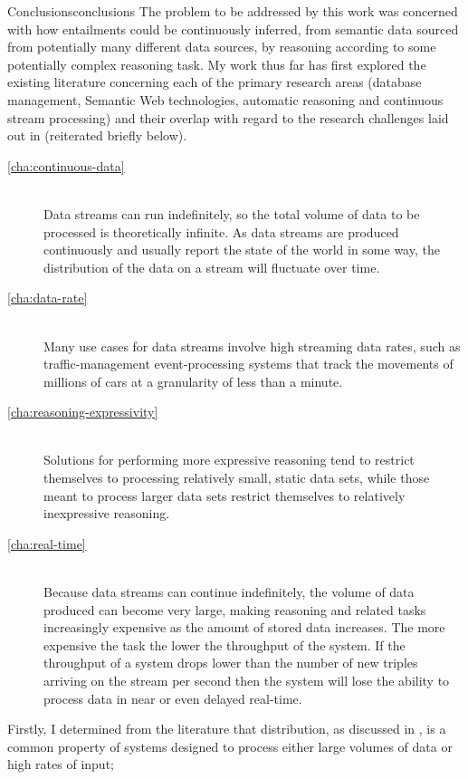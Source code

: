 \begin{nestedsection}{Conclusions}{conclusions}
	The problem to be addressed by this work was concerned with how entailments could be continuously inferred, from semantic data sourced from potentially many different data sources, by reasoning according to some potentially complex reasoning task.
	My work thus far has first explored the existing literature concerning each of the primary research areas (database management, Semantic Web technologies, automatic reasoning and continuous stream processing) and their overlap with regard to the research challenges laid out in  (reiterated briefly below).
	\begin{description}
		\item[\ref{cha:continuous-data}]\hfill\\
			Data streams can run indefinitely, so the total volume of data to be processed is theoretically infinite.
			As data streams are produced continuously and usually report the state of the world in some way, the distribution of the data on a stream will fluctuate over time.
		\item[\ref{cha:data-rate}]\hfill\\
			Many use cases for data streams involve high streaming data rates, such as traffic-management event-processing systems that track the movements of millions of cars at a granularity of less than a minute.
		\item[\ref{cha:reasoning-expressivity}]\hfill\\
			Solutions for performing more expressive reasoning tend to restrict themselves to processing relatively small, static data sets, while those meant to process larger data sets restrict themselves to relatively inexpressive reasoning.
		\item[\ref{cha:real-time}]\hfill\\
			Because data streams can continue indefinitely, the volume of data produced can become very large, making reasoning and related tasks increasingly expensive as the amount of stored data increases.
			The more expensive the task the lower the throughput of the system.
			If the throughput of a system drops lower than the number of new triples arriving on the stream per second then the system will lose the ability to process data in near or even delayed real-time.
	\end{description}
	Firstly, I determined from the literature that distribution, as discussed in , is a common property of systems designed to process either large volumes of data or high rates of input;

\end{nestedsection}
